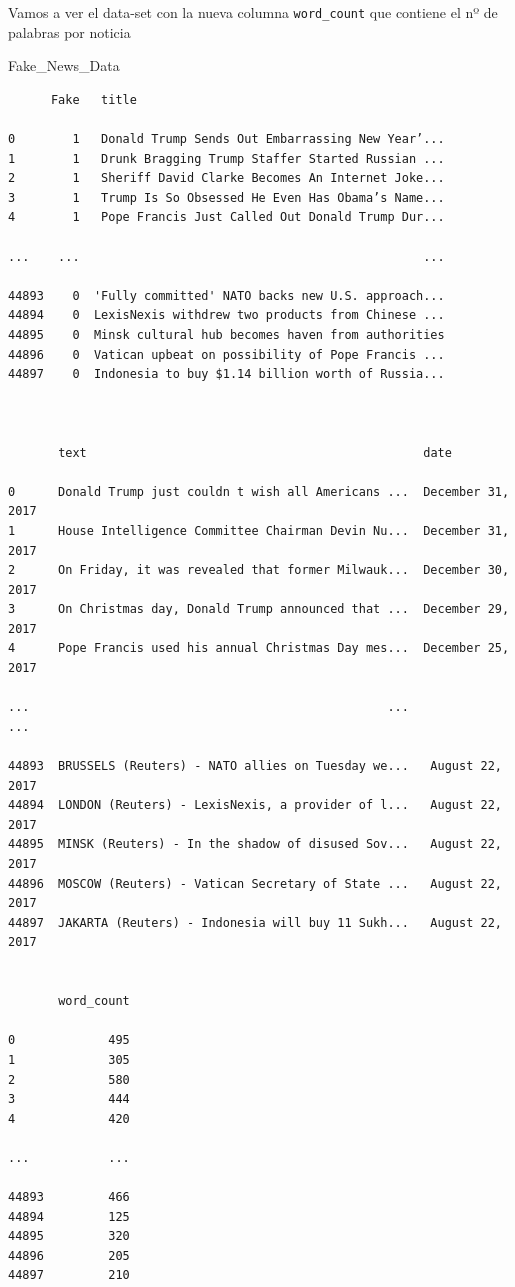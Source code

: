 \documentclass[
  11pt,
  a4paper,
]{article}
\newenvironment{Shaded}{\begin{snugshade}}{\end{snugshade}}
\newcommand{\NormalTok}[1]{#1}
\begin{document}
Vamos a ver el data-set con la nueva columna \texttt{word\_count} que
contiene el nº de palabras por noticia

\begin{Shaded}
\begin{Highlighting}[]
\NormalTok{Fake\_News\_Data}
\end{Highlighting}
\end{Shaded}

\begin{verbatim}
      Fake   title        
      
0        1   Donald Trump Sends Out Embarrassing New Year’...   
1        1   Drunk Bragging Trump Staffer Started Russian ...   
2        1   Sheriff David Clarke Becomes An Internet Joke...   
3        1   Trump Is So Obsessed He Even Has Obama’s Name...   
4        1   Pope Francis Just Called Out Donald Trump Dur...

...    ...                                                ...   

44893    0  'Fully committed' NATO backs new U.S. approach...   
44894    0  LexisNexis withdrew two products from Chinese ...   
44895    0  Minsk cultural hub becomes haven from authorities   
44896    0  Vatican upbeat on possibility of Pope Francis ...   
44897    0  Indonesia to buy $1.14 billion worth of Russia...   



       text                                               date               
       
0      Donald Trump just couldn t wish all Americans ...  December 31, 2017   
1      House Intelligence Committee Chairman Devin Nu...  December 31, 2017   
2      On Friday, it was revealed that former Milwauk...  December 30, 2017   
3      On Christmas day, Donald Trump announced that ...  December 29, 2017   
4      Pope Francis used his annual Christmas Day mes...  December 25, 2017   

...                                                  ...                ...   

44893  BRUSSELS (Reuters) - NATO allies on Tuesday we...   August 22, 2017    
44894  LONDON (Reuters) - LexisNexis, a provider of l...   August 22, 2017    
44895  MINSK (Reuters) - In the shadow of disused Sov...   August 22, 2017    
44896  MOSCOW (Reuters) - Vatican Secretary of State ...   August 22, 2017    
44897  JAKARTA (Reuters) - Indonesia will buy 11 Sukh...   August 22, 2017    


       word_count
       
0             495  
1             305  
2             580  
3             444  
4             420  

...           ...  

44893         466  
44894         125  
44895         320  
44896         205  
44897         210  
\end{verbatim}
\end{document}
